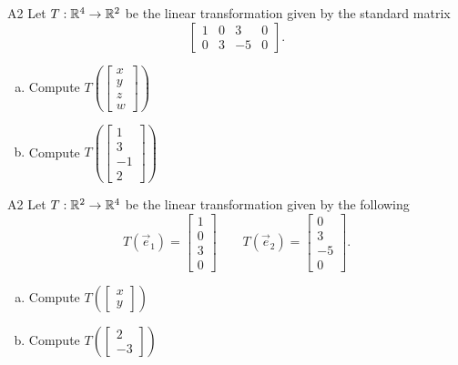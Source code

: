 \begin{problem}{A2}
Let $T: \mathbb{R}^4 \rightarrow \mathbb{R}^2$ be the linear transformation given by the standard matrix
$$\begin{bmatrix} 1 & 0 & 3 & 0 \\ 0 & 3 & -5 & 0 \end{bmatrix}.$$
\begin{enumerate}[(a)]
\item Compute \( T\left( \begin{bmatrix}x\\ y \\ z \\ w \end{bmatrix} \right) \)
\item Compute \( T\left( \begin{bmatrix} 1 \\ 3 \\ -1 \\ 2\end{bmatrix} \right) \)
\end{enumerate}
\end{problem}
\begin{solution}
\end{solution}

\begin{problem}{A2}
Let $T: \mathbb{R}^2 \rightarrow \mathbb{R}^4$ be the linear transformation given by the following
$$T(\vec e_1)=\begin{bmatrix} 1 \\ 0 \\ 3 \\ 0\end{bmatrix}\hspace{2em}
T(\vec e_2)=\begin{bmatrix} 0 \\ 3 \\ -5 \\ 0 \end{bmatrix}.$$
\begin{enumerate}[(a)]
\item Compute \( T\left( \begin{bmatrix}x\\ y  \end{bmatrix} \right) \)
\item Compute \( T\left( \begin{bmatrix} 2 \\ -3\end{bmatrix} \right) \)
\end{enumerate}
\end{problem}
\begin{solution}
\end{solution}

